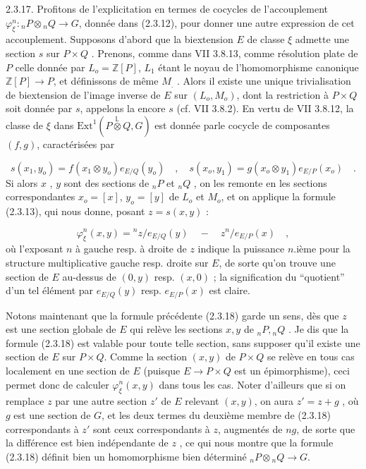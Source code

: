 2.3.17. \quad Profitons de l'explicitation en termes de cocycles de l'accouplement $\varphi_\xi^n : {}_nP \otimes {}_nQ \longrightarrow G$, donnée dans (2.3.12), pour donner une autre expression de cet accouplement. Supposons d'abord que la biextension $E$ de classe $\xi$ admette une section $s$ sur $P \times Q$ . Prenons, comme
dans VII 3.8.13, comme résolution plate de $P$ celle donnée par $L_o = \mathbb{Z}[P]$, $L_1$ étant le noyau de l'homomorphisme canonique $\mathbb{Z}[P] \longrightarrow P$, et définissons de même $M_{.}$ . Alors il existe une unique trivialisation de biextension de l'image inverse de $E$ sur $(L_o,M_o)$, dont la restriction à $P \times Q$ soit donnée par $s$, appelons la encore $s$ (cf. VII 3.8.2). En vertu de VII 3.8.12, la classe de $\xi$ dans $\mathrm{Ext}^1(P \stackrel{\mathbb{L}}{\otimes} Q, G)$ est donnée parle cocycle de composantes $(f,g)$, caractérisées par

\begin{equation*}
s(x_1,y_o) = f(x_1 \otimes y_o) e_{E/Q}(y_o) \quad , \quad s(x_o,y_1) = g(x_o \otimes y_1) e_{E/P}(x_o) \quad .
\end{equation*}
Si alors $x$ , $y$ sont des sections de ${}_nP$ et ${}_nQ$ , on les remonte en les sections correspondantes $x_o = [x]$, $y_o = [y]$ de $L_o$ et $M_o$, et on applique la formule (2.3.13), qui nous donne, posant $z = s(x,y)$ :

\begin{equation}\tag{2.3.18}
\varphi_{\xi}^{n}(x,y) = {}^{n}z/e_{E/Q}(y) \quad - \quad z^{n}/e_{E/P}(x) \quad ,
\end{equation}
où l'exposant $n$ à gauche resp. à droite de $z$ indique la puissance $n$.ième pour la structure multiplicative gauche resp. droite sur $E$, de sorte qu'on trouve une section de $E$ au-dessus de $(0,y)$ resp. $(x,0)$ ; la signification du ``quotient'' d'un tel élément par $e_{E/Q}(y)$ resp. $e_{E/P}(x)$ est claire.

Notons maintenant que la formule précédente (2.3.18) garde un sens, dès que $z$ est une section globale de $E$ qui relève les sections $x,y$ de ${}_nP, {}_nQ$ . Je dis que la formule (2.3.18) est valable pour toute telle section, sans supposer qu'il existe une section de $E$ sur $P \times Q$. Comme la section $(x,y)$ de $P \times Q$ se relève en tous cas localement en une section de $E$ (puisque $E \longrightarrow P \times Q$ est un épimorphisme), ceci permet donc de calculer $\varphi_{\xi}^{n}(x,y)$ dans tous les cas. Noter d'ailleurs que si on
remplace $z$ par une autre section $z'$ de $E$ relevant $(x,y)$, on aura $z' = z + g$ , où $g$ est une section de $G$, et les deux termes du deuxième membre de (2.3.18) correspondants à $z'$ sont ceux correspondants à $z$, augmentés de $ng$, de sorte que la différence est bien indépendante de $z$ , ce qui nous montre que la formule (2.3.18) définit bien un homomorphisme bien déterminé ${}_nP \otimes {}_nQ \longrightarrow G$.

